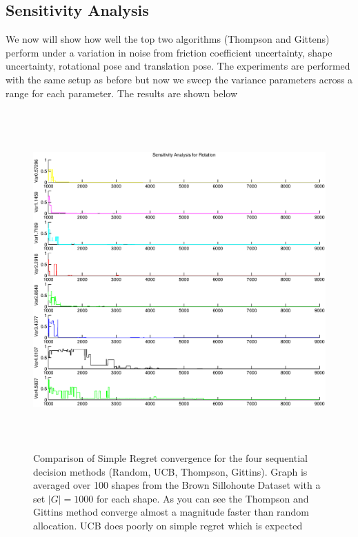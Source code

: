 \documentclass[letterpaper, 10 pt, conference]{ieeeconf}  %
\begin{document}
\subsection{Sensitivity Analysis }
We now will show how well the top two algorithms (Thompson and Gittens) perform under a variation in noise from friction coefficient uncertainty, shape uncertainty, rotational pose and translation pose. The experiments are performed with the same setup as before but now we sweep the variance parameters across a range for each parameter. The results are shown below 



\begin{figure}[ht!]
\centering
\includegraphics[width = 16.5cm, height = 13cm]{matlab_figures/sensitivity_rot.eps}
\caption{ \footnotesize Comparison of Simple Regret convergence for the four sequential decision methods (Random, UCB, Thompson, Gittins). Graph is averaged over 100 shapes from the Brown Sillohoute Dataset \cite{brown} with a set $|G|=1000$ for each shape. As you can see the Thompson and Gittins method converge almost a magnitude faster than random allocation. UCB does poorly on simple regret which is expected \cite{best_arm}}
\vspace*{-10pt}
\label{fig:simple_regret}
\end{figure}
\end{document}
